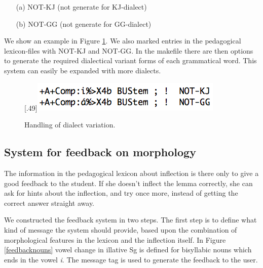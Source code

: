 \documentclass[11pt]{article}
\begin{document}
\begin{example}\label{ped}
\begin{itemize}
\item[(a)] NOT-KJ (not generate for KJ-dialect) 
\item[(b)] NOT-GG (not generate for GG-dialect)  
\end{itemize}
\end{example}

We show an example in Figure \ref{smelex}. We also marked entries in the pedagogical lexicon-files with NOT-KJ and NOT-GG. In the makefile there are then options to generate the required dialectical variant forms of each grammatical word. This system can easily be expanded with more dialects.


\begin{figure}[htbp]
\begin{center}
\scalebox{.49}[.49]{\includegraphics{presentation/img/smelex3.png}}\\
\caption{Handling of dialect variation.}
\label{smelex}
\end{center}
\end{figure}

\subsection{System for feedback on morphology}\label{mfeedback}

The information in the pedagogical lexicon about inflection is there only to give a good feedback to the student. If she doesn't inflect the lemma correctly, she can ask for hints about the inflection, and try once more, instead of getting the correct answer straight away. 

We constructed the feedback system in two steps. The first step is to define what kind of message the system should provide, based upon the combination of morphological features in the lexicon and the inflection itself. In Figure \ref{feedbacknouns} vowel change in illative Sg is defined for bisyllabic nouns which ends in the vowel \textit{i}. The message tag is used to generate the feedback to the user. 
\end{document}
